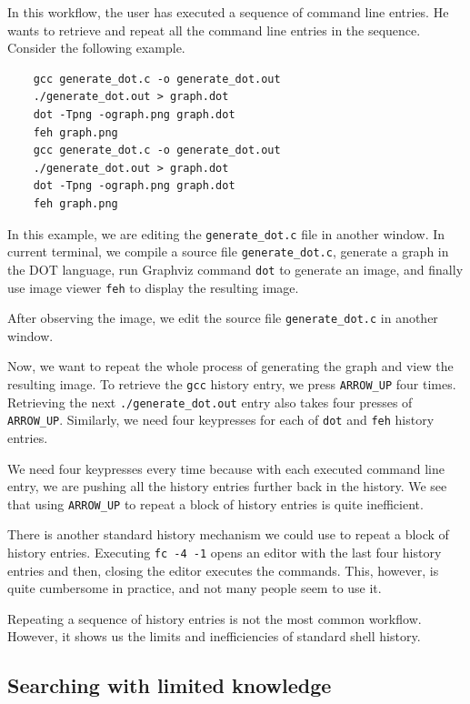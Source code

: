 In this workflow, the user has executed a sequence of command line entries. He wants to retrieve and repeat all the command line entries in the sequence. 
Consider the following example.

\begin{verbatim}
    gcc generate_dot.c -o generate_dot.out
    ./generate_dot.out > graph.dot
    dot -Tpng -ograph.png graph.dot
    feh graph.png
    gcc generate_dot.c -o generate_dot.out
    ./generate_dot.out > graph.dot
    dot -Tpng -ograph.png graph.dot
    feh graph.png
\end{verbatim}

In this example, we are editing the \verb|generate_dot.c| file in another window. In current terminal, we compile a source file \verb|generate_dot.c|, generate a graph in the DOT\cite{graphvizthedotlanguage} language, run Graphviz\cite{ellson2001graphviz} command \verb|dot| to generate an image, and finally use image viewer \verb|feh|\cite{toolsfeh} to display the resulting image.

After observing the image, we edit the source file \verb|generate_dot.c| in another window.


Now, we want to repeat the whole process of generating the graph and view the resulting image. To retrieve the \verb|gcc| history entry, we press \verb|ARROW_UP| four times. Retrieving the next \verb|./generate_dot.out| entry also takes four presses of \verb|ARROW_UP|. Similarly, we need four keypresses for each of \verb|dot| and \verb|feh| history entries. 

We need four keypresses every time because with each executed command line entry, we are pushing all the history entries further back in the history. We see that using \verb|ARROW_UP| to repeat a block of history entries is quite inefficient. 

There is another standard history mechanism we could use to repeat a block of history entries. 
Executing \verb|fc -4 -1| opens an editor with the last four history entries and then, closing the editor executes the commands. This, however, is quite cumbersome in practice, and not many people seem to use it. 


Repeating a sequence of history entries is not the most common workflow. However, it shows us the limits and inefficiencies of standard shell history.


\subsection{Searching with limited knowledge}\label{workflow-search-w-limited-knowledge}

